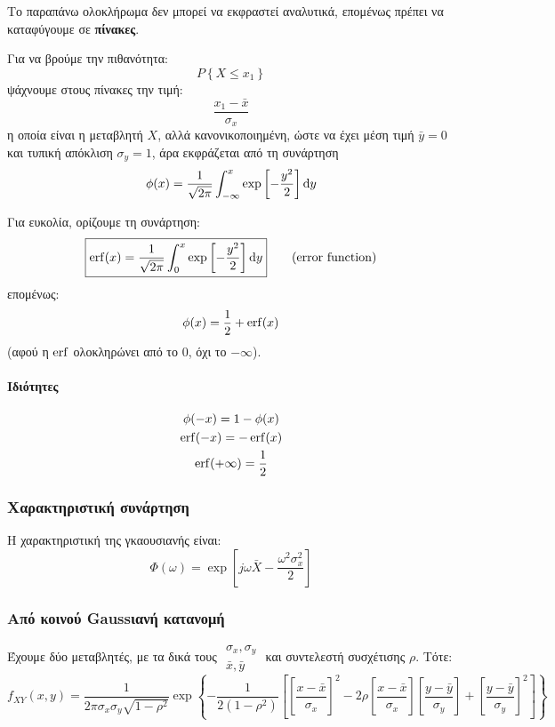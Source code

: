 \documentclass[11pt,a4paper,notitlepage,fleqn,draft]{article}
\begin{document}
Το παραπάνω ολοκλήρωμα δεν μπορεί να εκφραστεί αναλυτικά, επομένως πρέπει
να καταφύγουμε σε \textbf{πίνακες}.

Για να βρούμε την πιθανότητα:
\[
P \left\lbrace X \leq x_1 \right\rbrace
\]
ψάχνουμε στους πίνακες την τιμή:
\[
\boxed{\frac{x_1-\bar x}{\sigma_x}}
\]
η οποία είναι η μεταβλητή \( X \), αλλά κανονικοποιημένη, ώστε να έχει
μέση τιμή \( \bar y = 0 \) και τυπική απόκλιση \( \sigma_y = 1 \), άρα
εκφράζεται από τη συνάρτηση \[
\phi(x) = \frac{1}{\sqrt{2\pi}}
\int_{-\infty}^{x} \exp\left[-\frac{y^2}{2}\right]\mathop{}\!\mathrm{d} y
 \]

Για ευκολία, ορίζουμε τη συνάρτηση:
\[
\boxed{
	\operatorname{erf}(x) = \frac{1}{\sqrt{2\pi}}
	\int_{0}^{x} \exp\left[-\frac{y^2}{2}\right]\mathop{}\!\mathrm{d} y
	} \qquad \text{(error function)}
\]
επομένως:
\[
\phi(x) = \frac{1}{2} + \operatorname{erf}(x)
\]
(αφού η \( \operatorname{erf} \) ολοκληρώνει από το \( 0 \), όχι το
\( -\infty \)).

\paragraph{Ιδιότητες}
\begin{gather*}
	\phi(-x) = 1-\phi(x) \\
	\operatorname{erf}(-x) = -\operatorname{erf}(x) \\
	\operatorname{erf}(+\infty) = \frac{1}{2}
\end{gather*}

\subsubsection{Χαρακτηριστική συνάρτηση}
Η χαρακτηριστική της γκαουσιανής είναι:
\[
\Phi(\omega ) = \exp\left[
j\omega \bar X - \frac{\omega^2\sigma_x^2}{2}
\right]
\]

\subsubsection{Από κοινού Gaussιανή κατανομή}
Έχουμε δύο μεταβλητές, με τα δικά τους \( \begin{matrix}
\sigma_x,\sigma_y \\ \bar x,\bar y
\end{matrix} \) και συντελεστή συσχέτισης \( \rho \). Τότε:
\[
	f_{XY}(x,y) = \frac{1}{2\pi \sigma_x \sigma_y \sqrt{1-\rho^2}}
	\exp\left\lbrace 
	-\frac{1}{2(1-\rho^2)}\left[
	\left[
	\frac{x-\bar x}{\sigma_x}
	\right]^2 - 2\rho\left[\frac{x-\bar x}{\sigma_x}\right]\left[
	\frac{y-\bar y}{\sigma_y}
	\right] + \left[\frac{y-\bar y}{\sigma_y}\right]^2
	\right]
	 \right\rbrace
\]
\end{document}
